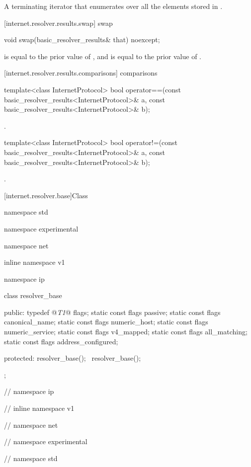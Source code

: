 \begin{itemdescr}
\pnum
\returns A terminating iterator that enumerates over all the  elements stored in .
\end{itemdescr}



[internet.resolver.results.swap]{ swap}

\begin{itemdecl}
void swap(basic_resolver_results& that) noexcept;
\end{itemdecl}

\begin{itemdescr}
\pnum
\postconditions {} is equal to the prior value of , and  is equal to the prior value of .
\end{itemdescr}



[internet.resolver.results.comparisons]{ comparisons}

\begin{itemdecl}
template<class InternetProtocol>
  bool operator==(const basic_resolver_results<InternetProtocol>& a,
                  const basic_resolver_results<InternetProtocol>& b);
\end{itemdecl}

\begin{itemdescr}
\pnum
\returns {}.
\end{itemdescr}

\begin{itemdecl}
template<class InternetProtocol>
  bool operator!=(const basic_resolver_results<InternetProtocol>& a,
                  const basic_resolver_results<InternetProtocol>& b);
\end{itemdecl}

\begin{itemdescr}
\pnum
\returns {}.
\end{itemdescr}




%
[internet.resolver.base]{Class }

%
\begin{codeblock}
namespace std {
namespace experimental {
namespace net {
inline namespace v1 {
namespace ip {

  class resolver_base
  {
  public:
    typedef @\textit{T1}@ flags;
    static const flags passive;
    static const flags canonical_name;
    static const flags numeric_host;
    static const flags numeric_service;
    static const flags v4_mapped;
    static const flags all_matching;
    static const flags address_configured;

  protected:
    resolver_base();
    ~resolver_base();
  };

} // namespace ip
} // inline namespace v1
} // namespace net
} // namespace experimental
} // namespace std
\end{codeblock}

